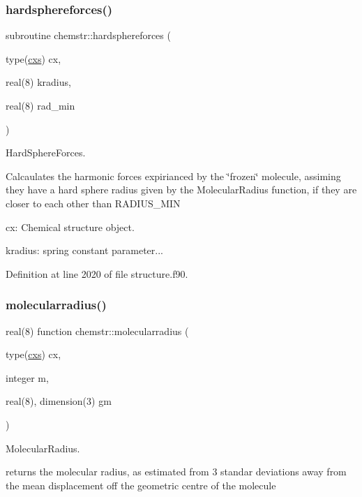 \subsubsection{\texorpdfstring{hardsphereforces()}{hardsphereforces()}}
{\footnotesize\ttfamily subroutine chemstr\+::hardsphereforces (\begin{DoxyParamCaption}\item[{type(\mbox{\hyperlink{structchemstr_1_1cxs}{cxs}})}]{cx,  }\item[{real(8)}]{kradius,  }\item[{real(8)}]{rad\+\_\+min }\end{DoxyParamCaption})}



Hard\+Sphere\+Forces. 

Calcaulates the harmonic forces expirianced by the \char`\"{}frozen\char`\"{} molecule, assiming they have a hard sphere radius given by the Molecular\+Radius function, if they are closer to each other than R\+A\+D\+I\+U\+S\+\_\+\+M\+IN


\begin{DoxyItemize}
\item cx\+: Chemical structure object.
\item kradius\+: spring constant parameter... 
\end{DoxyItemize}

Definition at line 2020 of file structure.\+f90.

\mbox{\label{namespacechemstr_a09e4fc34319aa0a6d4f52fe3da954fca}} 
\subsubsection{\texorpdfstring{molecularradius()}{molecularradius()}}
{\footnotesize\ttfamily real(8) function chemstr\+::molecularradius (\begin{DoxyParamCaption}\item[{type(\mbox{\hyperlink{structchemstr_1_1cxs}{cxs}})}]{cx,  }\item[{integer}]{m,  }\item[{real(8), dimension(3)}]{gm }\end{DoxyParamCaption})}



Molecular\+Radius. 

returns the molecular radius, as estimated from 3 standar deviations away from the mean displacement off the geometric centre of the molecule


